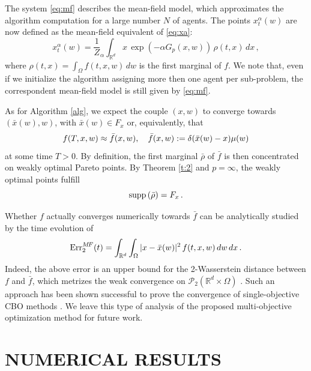 \documentclass[letterpaper, 10 pt, conference]{ieeeconf}  %
\begin{document}
The system \eqref{eq:mf} describes the mean-field model, which approximates the algorithm computation for a large number $N$ of agents. 
The points $x^\alpha_t (w)$ are now defined as the mean-field equivalent of \eqref{eq:xa}:
\begin{equation}
x_t^\alpha(w) =\frac1Z_\alpha \int_{\mathbb{R}^d} x\, \exp(-\alpha G_p(x,w))\, \rho(t,x)\, dx\,,
\label{eq:xa2}
\end{equation} 
where $\rho(t, x) = \int_{\Omega} f(t,x,w)\, dw$ is the first marginal of $f$.
We note that, even if we initialize the algorithm assigning more then one agent per sub-problem, the correspondent mean-field model is still given by \eqref{eq:mf}.

%

As for Algorithm \ref{alg}, we expect the couple $(x,w)$ to converge towards $(\bar x(w),w)$, with $ \bar x(w) \in F_x$ or, equivalently, that 
\begin{equation}\notag
f(T, x,w) \approx \bar f(x,w), \quad \bar f(x,w):= \delta( \bar x(w) - x) \mu(w)
\end{equation}
at some time $T>0$.  By definition, the first marginal $\bar \rho$ of $\bar f$ is then concentrated on weakly optimal Pareto points. By Theorem \ref{t:2} and $p=\infty$, the weakly optimal points fulfill
\begin{equation*}
\textup{supp} \left(\bar \rho \right) = F_x\,.
\end{equation*}

Whether $f$ actually converges numerically towards $\bar f$ can be analytically studied by the time evolution of 
\begin{equation}
\textup{Err}^{M\!F}_2 (t) = \int_{\mathbb{R}^d}\int_{\Omega} |x-\bar x(w)|^2\, f(t,x,w)\,dw\,dx\,.
\end{equation}
Indeed, the above error is an upper bound for the 2-Wasserstein distance between $f$ and $\bar f$, which metrizes the weak convergence on $\mathcal{P}_2(\mathbb{R}^d \times \Omega)$ \cite{santambrogio2015optimal}. 
Such an approach has been shown successful to prove the convergence of single-objective CBO methods \cite{fornasier2021consensusbased}. We leave this type of analysis of the proposed multi-objective optimization method for future work. 

%
\section{NUMERICAL RESULTS}
\label{s:num}
\end{document}
